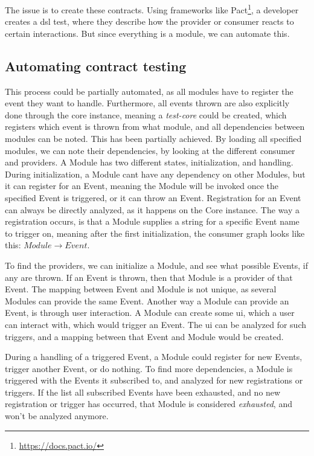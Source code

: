The issue is to create these contracts. Using frameworks like Pact\footnote{\url{https://docs.pact.io/}},
a developer creates a \gls*{dsl} test, where they describe how the provider or
consumer reacts to certain interactions. But since everything is a module, we
can automate this.

\subsection{Automating contract testing}

This process could be partially automated, as all modules have to register the
event they want to handle. Furthermore, all events thrown are also explicitly
done through the core instance, meaning a \textit{test-core} could be created,
which registers which event is thrown from what module, and all dependencies
between modules can be noted. This has been partially achieved. By loading all
specified modules, we can note their dependencies, by looking at the different
consumer and providers. A Module has two different states, initialization, and
handling. During initialization, a Module cant have any dependency on other
Modules, but it can register for an Event, meaning the Module will be invoked
once the specified Event is triggered, or it can throw an Event. Registration
for an Event can always be directly analyzed, as it happens on the Core
instance. The way a registration occurs, is that a Module supplies a string for
a specific Event name to trigger on, meaning after the first initialization, the
consumer graph looks like this: $Module \to Event$.

To find the providers, we can initialize a Module, and see what possible
Events, if any are thrown. If an Event is thrown, then that Module is a
provider of that Event. The mapping between Event and Module is not unique,
as several Modules can provide the same Event. Another way a Module can
provide an Event, is through user interaction. A Module can create some
\gls*{ui}, which a user can interact with, which would trigger an Event. The
\gls*{ui} can be analyzed for such triggers, and a mapping between that Event and
Module would be created.

During a handling of a triggered Event, a Module could register for new
Events, trigger another Event, or do nothing. To find more dependencies, a
Module is triggered with the Events it subscribed to, and analyzed for new
registrations or triggers. If the list all subscribed Events have been
exhausted, and no new registration or trigger has occurred, that Module is
considered \textit{exhausted}, and won't be analyzed anymore.

